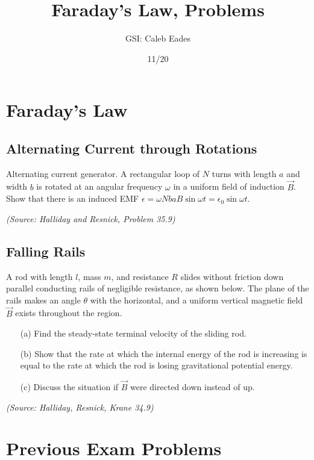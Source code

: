 \documentclass{article}
\begin{document}
\title{Faraday's Law, Problems}
\author{GSI: Caleb Eades}
\date{11/20}
\maketitle

\section{Faraday's Law}

\subsection{Alternating Current through Rotations}

Alternating current generator. A rectangular loop of $N$ turns with length $a$ and width $b$ is rotated at an angular frequency $\omega$ in a uniform field of induction $\vec{B}$. Show that there is an induced EMF $\epsilon = \omega Nba B \sin \omega t = \epsilon_0 \sin \omega t$.

\textit{(Source: Halliday and Resnick, Problem 35.9)}

\subsection{Falling Rails}

A rod with length $l$, mass $m$, and resistance $R$ slides without friction down parallel conducting rails of negligible resistance, as shown below. The plane of the rails makes an angle $\theta$ with the horizontal, and a uniform vertical magnetic field $\vec{B}$ exists throughout the region.
\begin{itemize}
	\item[(a)] Find the steady-state terminal velocity of the sliding rod.
	\item[(b)] Show that the rate at which the internal energy of the rod is increasing is equal to the rate at which the rod is losing gravitational potential energy.
	\item[(c)] Discuss the situation if $\vec{B}$ were directed down instead of up.
\end{itemize}

\textit{(Source: Halliday, Resnick, Krane 34.9)}

\section{Previous Exam Problems}
\end{document}
